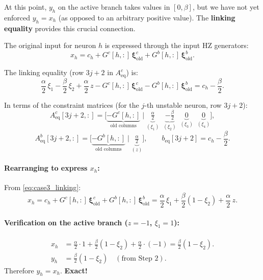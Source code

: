\documentclass{article}
\begin{document}

At this point, $y_h$ on the active branch takes values in $[0, \beta]$, but we have not yet enforced $y_h = x_h$ (as opposed to an arbitrary positive value). The \textbf{linking equality} provides this crucial connection.

The original input for neuron $h$ is expressed through the input HZ generators:
\begin{equation}
x_h = c_h + G^c[h,:]\,\boldsymbol{\xi}^c_{\mathrm{old}} + G^b[h,:]\,\boldsymbol{\xi}^b_{\mathrm{old}}.
\end{equation}

The linking equality (row $3j{+}2$ in $A^c_{\mathrm{eq}}$) is:
\begin{equation}
\label{eq:case3_linking}
\boxed{
\frac{\alpha}{2}\,\xi_1 - \frac{\beta}{2}\,\xi_2 + \frac{\alpha}{2}\,z - G^c[h,:]\,\boldsymbol{\xi}^c_{\mathrm{old}} - G^b[h,:]\,\boldsymbol{\xi}^b_{\mathrm{old}} = c_h - \frac{\beta}{2}.
}
\end{equation}

In terms of the constraint matrices (for the $j$-th unstable neuron, row $3j{+}2$):
\begin{equation}
\label{eq:linking_matrix}
A^c_{\mathrm{eq}}[3j{+}2, :] = \bigl[\underbrace{-G^c[h,:]}_{\text{old columns}} \;\big|\; \underbrace{\tfrac{\alpha}{2}}_{(\xi_1)} \;\; \underbrace{-\tfrac{\beta}{2}}_{(\xi_2)} \;\; \underbrace{0}_{(\xi_3)} \;\; \underbrace{0}_{(\xi_4)}\bigr],
\end{equation}
\begin{equation}
A^b_{\mathrm{eq}}[3j{+}2, :] = \bigl[\underbrace{-G^b[h,:]}_{\text{old columns}} \;\big|\; \underbrace{\tfrac{\alpha}{2}}_{(z)}\bigr], \qquad
b_{\mathrm{eq}}[3j{+}2] = c_h - \frac{\beta}{2}.
\end{equation}

\paragraph{Rearranging to express $x_h$:}

From \eqref{eq:case3_linking}:
\begin{equation}
x_h = c_h + G^c[h,:]\,\boldsymbol{\xi}^c_{\mathrm{old}} + G^b[h,:]\,\boldsymbol{\xi}^b_{\mathrm{old}} = \frac{\alpha}{2}\,\xi_1 + \frac{\beta}{2}(1 - \xi_2) + \frac{\alpha}{2}\,z.
\end{equation}

\paragraph{Verification on the active branch ($z = -1$, $\xi_1 = 1$):}
\begin{align}
x_h &= \frac{\alpha}{2} \cdot 1 + \frac{\beta}{2}(1 - \xi_2) + \frac{\alpha}{2} \cdot (-1) = \frac{\beta}{2}(1 - \xi_2). \\
y_h &= \frac{\beta}{2}(1 - \xi_2) \quad (\text{from Step 2}).
\end{align}
Therefore $y_h = x_h$. \checkmark \quad \textbf{Exact!}
\end{document}
